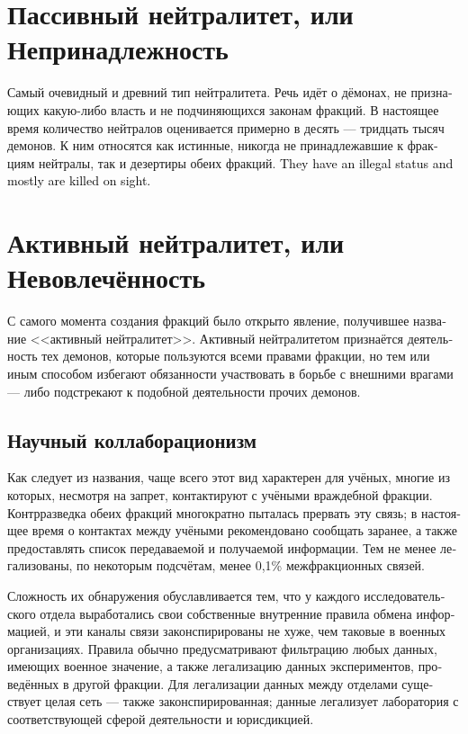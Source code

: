 \documentclass[a4paper,12pt,fleqn]{book}\usepackage{cooltooltips}\usepackage{polyglossia}\setdefaultlanguage[babelshorthands=true]{russian}\setotherlanguage{english}\defaultfontfeatures{Ligatures=TeX,Mapping=tex-text} \usepackage{xcolor}\definecolor{lightgray}{HTML}{bbbbbb}\color{lightgray}\newcommand{\ml}[3]{\textenglish{\textcolor{black}{#3}}}
\begin{document}
{\section{Пассивный нейтралитет, или Непринадлежность}

Самый очевидный и древний тип нейтралитета.
Речь идёт о дёмонах, не признающих какую-либо власть и не подчиняющихся законам фракций.
В настоящее время количество нейтралов оценивается примерно в десять --- тридцать тысяч демонов.
К ним относятся как истинные, никогда не принадлежавшие к фракциям нейтралы, так и дезертиры обеих фракций.
\ml{$0$}
{Они находятся на нелегальном положении и чаще всего уничтожаются при обнаружении.}
{They have an illegal status and mostly are killed on sight.}

\section{Активный нейтралитет, или Невовлечённость}

С самого момента создания фракций было открыто явление, получившее название <<активный нейтралитет>>.
Активный нейтралитетом признаётся деятельность тех демонов, которые пользуются всеми правами фракции, но тем или иным способом избегают обязанности участвовать в борьбе с внешними врагами --- либо подстрекают к подобной деятельности прочих демонов.

\subsection{Научный коллаборационизм}

Как следует из названия, чаще всего этот вид характерен для учёных, многие из которых, несмотря на запрет, контактируют с учёными враждебной фракции.
Контрразведка обеих фракций многократно пыталась прервать эту связь;
в настоящее время о контактах между учёными рекомендовано сообщать заранее, а также предоставлять список передаваемой и получаемой информации.
Тем не менее легализованы, по некоторым подсчётам, менее 0,1\% межфракционных связей.

Сложность их обнаружения обуславливается тем, что у каждого исследовательского отдела выработались свои собственные внутренние правила обмена информацией, и эти каналы связи законспирированы не хуже, чем таковые в военных организациях.
Правила обычно предусматривают фильтрацию любых данных, имеющих военное значение, а также легализацию данных экспериментов, проведённых в другой фракции.
Для легализации данных между отделами существует целая сеть --- также законспирированная;
данные легализует лаборатория с соответствующей сферой деятельности и юрисдикцией.

}
\end{document}

